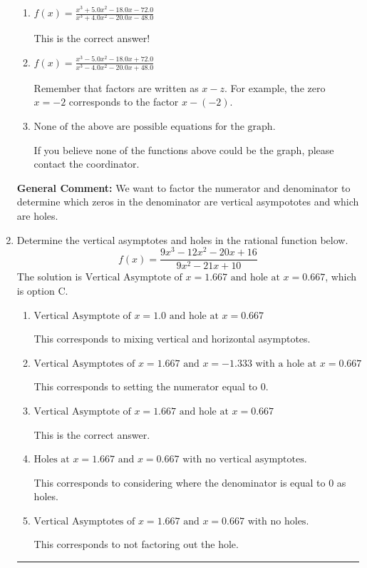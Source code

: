 \documentclass{extbook}[14pt]
\newcommand{\litem}[1]{\item #1

\rule{\textwidth}{0.4pt}}
\begin{document}
\begin{enumerate}
{\begin{enumerate}[label=\Alph*.]
You treated all of the zeros in the denominator as vertical asymptotes when some of them were holes!
\item \( f(x)=\frac{x^{3} +5.0 x^{2} -18.0 x -72.0}{x^{3} +4.0 x^{2} -20.0 x -48.0} \)

This is the correct answer!
\item \( f(x)=\frac{x^{3} -5.0 x^{2} -18.0 x + 72.0}{x^{3} -4.0 x^{2} -20.0 x + 48.0} \)

Remember that factors are written as $x-z$. For example, the zero $x=-2$ corresponds to the factor $x-(-2)$.
\item \( \text{None of the above are possible equations for the graph.} \)

If you believe none of the functions above could be the graph, please contact the coordinator.
\end{enumerate}

\textbf{General Comment:} We want to factor the numerator and denominator to determine which zeros in the denominator are vertical asympototes and which are holes.
}
\litem{
Determine the vertical asymptotes and holes in the rational function below.
\[ f(x) = \frac{9x^{3} -12 x^{2} -20 x + 16}{9x^{2} -21 x + 10} \]The solution is \( \text{Vertical Asymptote of } x = 1.667 \text{ and hole at } x = 0.667 \), which is option C.\begin{enumerate}[label=\Alph*.]
\item \( \text{Vertical Asymptote of } x = 1.0 \text{ and hole at } x = 0.667 \)

This corresponds to mixing vertical and horizontal asymptotes.
\item \( \text{Vertical Asymptotes of } x = 1.667 \text{ and } x = -1.333 \text{ with a hole at } x = 0.667 \)

This corresponds to setting the numerator equal to 0.
\item \( \text{Vertical Asymptote of } x = 1.667 \text{ and hole at } x = 0.667 \)

This is the correct answer.
\item \( \text{Holes at } x = 1.667 \text{ and } x = 0.667 \text{ with no vertical asymptotes.} \)

This corresponds to considering where the denominator is equal to 0 as holes.
\item \( \text{Vertical Asymptotes of } x = 1.667 \text{ and } x = 0.667 \text{ with no holes.} \)

This corresponds to not factoring out the hole.
\end{enumerate}

}
\end{enumerate}
\end{document}
